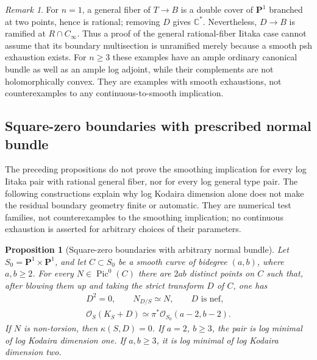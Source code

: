 \documentclass[11pt]{amsart}
\newtheorem{proposition}[theorem]{Proposition}
\theoremstyle{definition}
\theoremstyle{remark}
\newtheorem{remark}[theorem]{Remark}
\numberwithin{equation}{section}
\newcommand{\C}{\mathbb C}
\newcommand{\PP}{\mathbf P}
\newcommand{\OO}{\mathcal O}
\begin{document}
\begin{remark}
For $n=1$, a general fiber of $T\to B$ is a double cover of
$\PP^1$ branched at two points, hence is rational; removing $D$
gives $\C^*$.  Nevertheless, $D\to B$ is ramified at
$R\cap C_\infty$.  Thus a proof of the general rational-fiber
Iitaka case cannot assume that its boundary multisection is
unramified merely because a smooth psh exhaustion exists.
For $n\ge3$ these examples have an ample ordinary canonical bundle
as well as an ample log adjoint, while their complements are not
holomorphically convex.  They are examples with smooth exhaustions,
not counterexamples to any continuous-to-smooth implication.
\end{remark}

\subsection{Square-zero boundaries with prescribed normal bundle}

The preceding propositions do not prove the smoothing implication
for every log Iitaka pair with rational general fiber, nor for every
log general type pair.  The following constructions explain why log
Kodaira dimension alone does not make the residual boundary geometry
finite or automatic.  They are numerical test families, not
counterexamples to the smoothing implication; no continuous exhaustion
is asserted for arbitrary choices of their parameters.

\begin{proposition}[Square-zero boundaries with arbitrary normal bundle]
\label{prop:surface-arbitrary-normal}
Let $S_0=\PP^1\times\PP^1$, and let $C\subset S_0$ be a smooth
curve of bidegree $(a,b)$, where $a,b\ge2$.  For every
$N\in\operatorname{Pic}^0(C)$ there are $2ab$ distinct points on
$C$ such that, after blowing them up and taking the strict transform
$D$ of $C$, one has
\[
 \begin{gathered}
 D^2=0,\qquad N_{D/S}\simeq N,\qquad D\text{ is nef},\\
 \OO_S(K_S+D)\simeq\pi^*\OO_{S_0}(a-2,b-2).
 \end{gathered}
\]
If $N$ is non-torsion, then $\kappa(S,D)=0$.
If $a=2$, $b\ge3$, the pair is log minimal of log Kodaira dimension
one.  If $a,b\ge3$, it is log minimal of log Kodaira dimension two.
\end{proposition}
\end{document}
